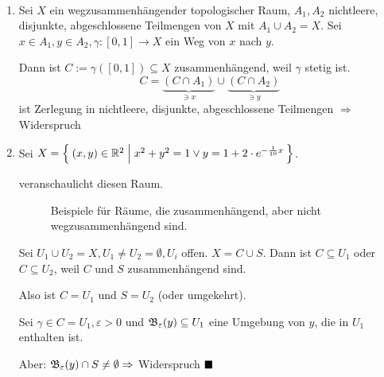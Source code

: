 \begin{beweis}~\\
    \begin{enumerate}[label=(\roman*)]
    \item Sei $X$ ein wegzusammenhängender topologischer Raum, $A_1, A_2$
    nichtleere, disjunkte, abgeschlossene Teilmengen von $X$ mit
    $A_1 \cup A_2 = X$. Sei $x \in A_1, y \in A_2, \gamma:[0,1] \rightarrow X$
    ein Weg von $x$ nach $y$.

    Dann ist $C:= \gamma([0,1]) \subseteq X$ zusammenhängend, weil 
    $\gamma$ stetig ist.
    \[C = \underbrace{(C \cap A_1)}_{\ni x} \cup \underbrace{(C \cap A_2)}_{\ni y}\]
    ist Zerlegung in nichtleere, disjunkte, abgeschlossene Teilmengen
    $\Rightarrow$ Widerspruch 

    \item Sei $X = \Set{(x,y) \in \ensuremath{\mathbb{R}}^2| x^2 + y^2 = 1 \lor y = 1 +2\cdot e^{-\frac{1}{10} x}}$.

         veranschaulicht diesen Raum.

        \begin{figure}[htp]
            \centering
            \subfloat[Sinus]{
                \resizebox{0.65\linewidth}{!}{}
                \label{fig:sinx}
            }%

            \caption{Beispiele für Räume, die zusammenhängend, aber nicht wegzusammenhängend sind.}
            \label{fig:zusammenhang-beispiele}
        \end{figure}

          Sei $U_1 \cup U_2 = X, U_1 \neq U_2 = \emptyset, U_i$ offen.
          $X = C \cup S$. Dann ist $C \subseteq U_1$ oder $C \subseteq U_2$,
          weil $C$ und $S$ zusammenhängend sind.

          Also ist $C = U_1$ und $S = U_2$ (oder umgekehrt).

          Sei $\gamma \in C = U_1, \varepsilon > 0$ und $\mathfrak{B}_\varepsilon (y) \subseteq U_1$
          eine Umgebung von $y$, die in $U_1$ enthalten ist.

          Aber: $\mathfrak{B}_\varepsilon(y) \cap S \neq \emptyset \Rightarrow$
          Widerspruch 
$\qed$
    \end{enumerate}
\end{beweis}

